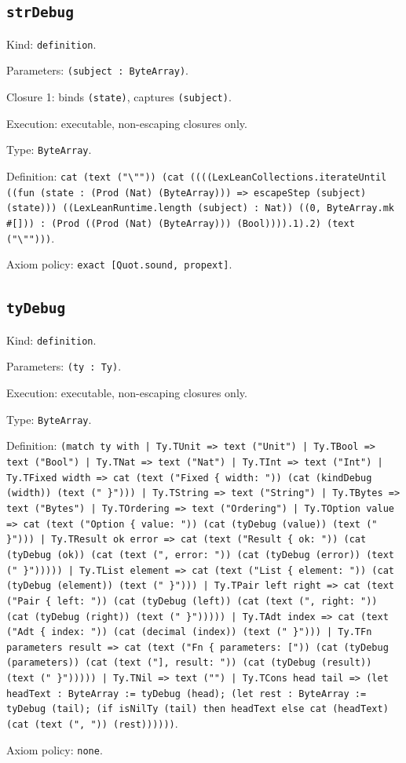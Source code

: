 \documentclass[11pt]{article}
\begin{document}
\subsection*{\texttt{strDebug}}
\noindent Kind: \texttt{definition}.\par
\noindent Parameters: \texttt{(subject : ByteArray)}.\par
\noindent Closure 1: binds \texttt{(state)}, captures \texttt{(subject)}.\par
\noindent Execution: executable, non-escaping closures only.\par
\noindent Type: \texttt{ByteArray}.\par
\noindent Definition: \texttt{cat (text ("\textbackslash{}"")) (cat ((((LexLeanCollections.iterateUntil ((fun (state : (Prod (Nat) (ByteArray))) => escapeStep (subject) (state))) ((LexLeanRuntime.length (subject) : Nat)) ((0, ByteArray.mk \#[])) : (Prod ((Prod (Nat) (ByteArray))) (Bool)))).1).2) (text ("\textbackslash{}"")))}.\par
\noindent Axiom policy: \texttt{exact [Quot.sound, propext]}.\par
\subsection*{\texttt{tyDebug}}
\noindent Kind: \texttt{definition}.\par
\noindent Parameters: \texttt{(ty : Ty)}.\par
\noindent Execution: executable, non-escaping closures only.\par
\noindent Type: \texttt{ByteArray}.\par
\noindent Definition: \texttt{(match ty with | Ty.TUnit => text ("Unit") | Ty.TBool => text ("Bool") | Ty.TNat => text ("Nat") | Ty.TInt => text ("Int") | Ty.TFixed width => cat (text ("Fixed \{ width: ")) (cat (kindDebug (width)) (text (" \}"))) | Ty.TString => text ("String") | Ty.TBytes => text ("Bytes") | Ty.TOrdering => text ("Ordering") | Ty.TOption value => cat (text ("Option \{ value: ")) (cat (tyDebug (value)) (text (" \}"))) | Ty.TResult ok error => cat (text ("Result \{ ok: ")) (cat (tyDebug (ok)) (cat (text (", error: ")) (cat (tyDebug (error)) (text (" \}"))))) | Ty.TList element => cat (text ("List \{ element: ")) (cat (tyDebug (element)) (text (" \}"))) | Ty.TPair left right => cat (text ("Pair \{ left: ")) (cat (tyDebug (left)) (cat (text (", right: ")) (cat (tyDebug (right)) (text (" \}"))))) | Ty.TAdt index => cat (text ("Adt \{ index: ")) (cat (decimal (index)) (text (" \}"))) | Ty.TFn parameters result => cat (text ("Fn \{ parameters: [")) (cat (tyDebug (parameters)) (cat (text ("], result: ")) (cat (tyDebug (result)) (text (" \}"))))) | Ty.TNil => text ("") | Ty.TCons head tail => (let headText : ByteArray := tyDebug (head); (let rest : ByteArray := tyDebug (tail); (if isNilTy (tail) then headText else cat (headText) (cat (text (", ")) (rest))))))}.\par
\noindent Axiom policy: \texttt{none}.\par
\end{document}

